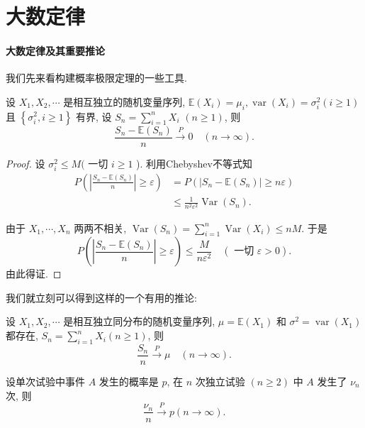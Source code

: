 \section{大数定律}
\paragraph{大数定律及其重要推论}

我们先来看构建概率极限定理的一些工具.

\begin{theorem}[Chebyshev大数律] 
    设 $X_1, X_2, \cdots$ 是相互独立的随机变量序列, $\mathbb{E}\left(X_i\right)=\mu_i, \operatorname{var}\left(X_i\right)=\sigma_i^2(i \geq 1)$ 且 $\left\{\sigma_i^2, i \geq 1\right\}$ 有界, 设 $S_n=\sum_{i=1}^n X_i$ $(n \geq 1)$, 则
$$
\frac{S_n-\mathbb{E}\left(S_n\right)}{n} \stackrel{P}{\longrightarrow} 0 \quad(n \rightarrow \infty) .
$$
\end{theorem}

\begin{proof}
    设 $\sigma_i^2 \leq M($ 一切 $i \geq 1$ ). 利用Chebyshev不等式知
$$
\begin{aligned}
P\left(\left|\frac{S_n-\mathbb{E}\left(S_n\right)}{n}\right| \geq \varepsilon\right) & =P\left(\left|S_n-\mathbb{E}\left(S_n\right)\right| \geq n \varepsilon\right) \\
& \leq \frac{1}{n^2 \varepsilon^2} \operatorname{Var}\left(S_n\right) .
\end{aligned}
$$

由于 $X_1, \cdots, X_n$ 两两不相关, $\operatorname{Var}\left(S_n\right)=\sum_{i=1}^n \operatorname{Var}\left(X_i\right) \leq n M$. 于是
$$
P\left(\left|\frac{S_n-\mathbb{E}\left(S_n\right)}{n}\right| \geq \varepsilon\right) \leq \frac{M}{n \varepsilon^2} \quad(\text { 一切 } \varepsilon>0) .
$$
由此得证. 

\end{proof}

我们就立刻可以得到这样的一个有用的推论: 

\begin{corollary}
    设 $X_1, X_2, \cdots$ 是相互独立同分布的随机变量序列, $\mu=\mathbb{E}\left(X_1\right)$ 和 $\sigma^2=\operatorname{var}\left(X_1\right)$ 都存在, $S_n=\sum_{i=1}^n X_i(n \geq 1)$, 则
    $$
    \frac{S_n}{n} \stackrel{P}{\longrightarrow} \mu \quad(n \rightarrow \infty) .
    $$
\end{corollary}



\begin{corollary}
    设单次试验中事件 $A$ 发生的概率是 $p$, 在 $n$ 次独立试验 $(n \geq 2)$ 中 $A$ 发生了 $\nu_n$ 次, 则
$$
\frac{\nu_n}{n} \stackrel{P}{\longrightarrow} p(n \rightarrow \infty) .
$$
\end{corollary}

